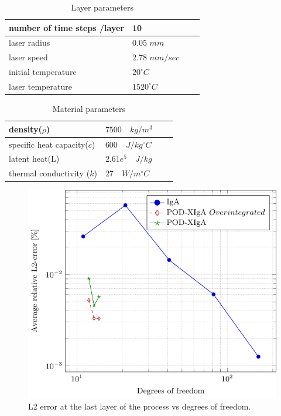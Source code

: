 \documentclass[3p]{article}
\begin{document}
\begin{table}[!h]
\centering
    \begin{tabular}{ | l | l | l | p{5cm} |}
    \hline
    number of time steps /layer & 10\\ \hline
    laser radius & $0.05$ ${mm}$\\ \hline
    laser speed & $2.78$ ${mm}/{sec}$\\ \hline
    initial temperature & $20^{\circ}C$\\ \hline
    laser temperature & $1520^{\circ}C$\\ 
    \hline
    \end{tabular}
\caption{Layer parameters}
\label{table::laserParameters}
\end{table}

\begin{table}[!h]
\centering
    \begin{tabular}{ | l | l | l | p{5cm} |}
    \hline
    density($\rho$) & $7500 \quad {kg}/{m^{3}}$\\ \hline
    specific heat capacity($c$) & $600 \quad {J}/{kg^{\circ}C}$\\ \hline
    latent heat($\mathrm{L}$) & $2.61e^{5} \quad {J}/{kg}$\\  \hline
    thermal conductivity ($k$) & $27 \quad {W}/{m^{\circ}C}$\\ 
    \hline
    \end{tabular}
\caption{Material parameters}
\label{table::materialParameters}
\end{table}

\begin{figure}[!h]
\centering
\includegraphics[width=0.75\linewidth]{externals/pgfplots/PODXIGA/L2ErrorVsDofs.pdf}

    \caption{L2 error at the last layer of the process vs degrees of freedom.}
    \label{L2DofsError}
\end{figure}
\end{document}

